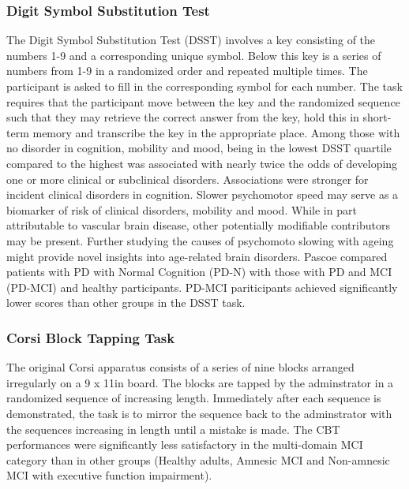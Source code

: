 \documentclass[12pt, twoside, a4paper]{article}
\begin{document}
\subsubsection{Digit Symbol Substitution Test}
The Digit Symbol Substitution Test (DSST) involves a key consisting of the numbers 1-9 and a corresponding unique symbol. Below this key is a series of numbers from 1-9 in a randomized order and repeated multiple times. The participant is asked to fill in the corresponding symbol for each number. The task requires that the participant move between the key and the randomized sequence such that  they may retrieve the correct answer from the key, hold this in short-term memory and transcribe the key in the appropriate place.
Among those with no disorder in cognition, mobility and mood, being in the lowest DSST quartile compared to the highest was associated with nearly twice the odds of developing one or more clinical or subclinical disorders. Associations were stronger for incident clinical disorders in cognition. Slower psychomotor speed may serve as a biomarker of risk of clinical disorders, mobility and mood. While in part attributable to vascular brain disease, other potentially modifiable contributors may be present. Further studying the causes of psychomoto slowing with ageing might provide novel insights into age-related brain disorders.
Pascoe compared patients with PD with Normal Cognition (PD-N) with those with PD and MCI (PD-MCI) and healthy participants. PD-MCI pariticipants achieved significantly lower scores than other groups in the DSST task.  
\subsubsection{Corsi Block Tapping Task}
The original Corsi apparatus consists of a series of nine blocks arranged irregularly on a 9 x 11in board. The blocks are tapped by the adminstrator in a randomized sequence of increasing length. Immediately after each sequence is demonstrated, the task is to mirror the sequence back to the adminstrator with the sequences increasing in length until a mistake is made.
The CBT performances were significantly less satisfactory in the multi-domain MCI category than in other groups (Healthy adults, Amnesic MCI and Non-amnesic MCI with executive function impairment).  
\end{document}
